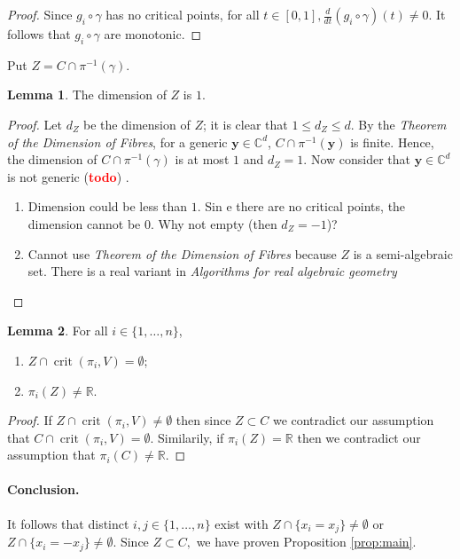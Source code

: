 \documentclass[10pt]{article}
\theoremstyle{definition}
\newtheorem{lemma}{Lemma}
\newcommand{\C}{\mathbb{C}}
\newcommand{\R}{\mathbb{R}}
\def\td{(\textcolor{red}{{\bf todo}})}
\def\td{(\textcolor{red}{{\bf todo}}) }
\DeclareMathOperator{\crit}{crit}
\begin{document}
%
%
\begin{proof}
Since $g_i \circ \gamma$ has no critical points, for all $t \in [0,1], \frac{d}{dt}\left(g_i \circ \gamma\right)(t)\not =0.$ It follows that $g_i \circ \gamma$ are monotonic. 
\end{proof}
%
\noindent 
Put $Z = C \cap \pi^{-1}(\gamma).$ 
%
\begin{lemma}
The dimension of $Z$ is $1$. 
\end{lemma}
%
%
\begin{proof}
Let $d_Z$ be the dimension of $Z$; it is clear that $1 \leq d_Z \leq d$. By the 
\textit{Theorem of the Dimension of Fibres}\cite{Shafarevich}, for a generic $\bm y \in \C^d$, $C \cap \pi^{-1}(\bm y)$ is finite. Hence, the dimension of $C \cap \pi^{-1}(\gamma)$ is at most $1$ and $d_Z=1$. Now consider that $\bm y \in \C^d$ is not generic \td.


\begin{enumerate}
    \item Dimension could be less than $1$. Sin e there are no critical points, the dimension cannot be $0$. Why not empty (then $d_Z = -1$)?
    \item Cannot use \textit{Theorem of the Dimension of Fibres} because $Z$ is a semi-algebraic set. There is a real variant in \textit{Algorithms for real algebraic geometry} 
\end{enumerate}


\end{proof}
%
%
\begin{lemma}\label{lemma:DimensionOneAssumptionsHold}
For all $i \in \{1,\hdots,n\}$, 
\begin{enumerate}
    \item $Z \cap \crit(\pi_i,V) = \emptyset$;
    \item $\pi_i(Z) \not = \R$.
\end{enumerate}
\end{lemma}
%
%
\begin{proof}
If $Z \cap \crit(\pi_i,V) \not = \emptyset$ then since $Z \subset C$ we contradict our assumption that $C \cap \crit(\pi_i,V) = \emptyset$. Similarily, if $\pi_i(Z) = \R$ then we contradict our assumption that $\pi_i(C) \not = \R.$  
\end{proof}
%









\paragraph*{Conclusion.}
It follows that distinct $i,j \in\{1,\hdots,n\}$ exist with $Z \cap \{ x_i= x_j\} \not = \emptyset$ or 
$Z \cap \{ x_i= -x_j\} \not = \emptyset.$ Since $Z \subset C,$ we have proven Proposition \ref{prop:main}.
\end{document}
